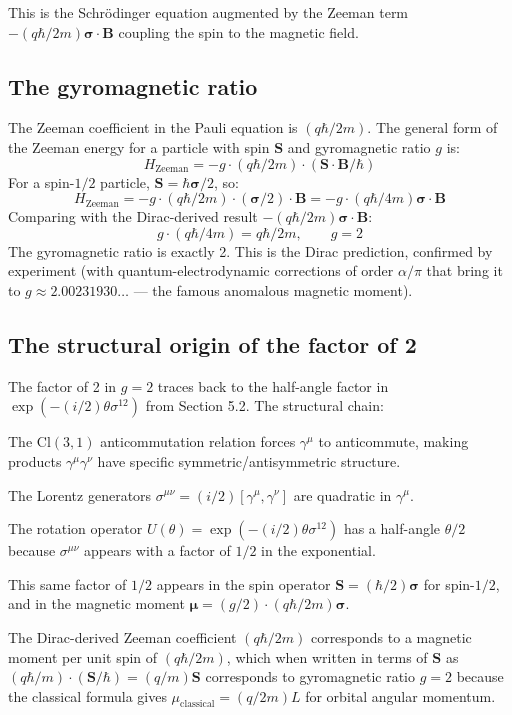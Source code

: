 \documentclass[11pt,a4paper]{article}
\begin{document}
This is the Schr\"odinger equation augmented by the Zeeman term $-(q\hbar/2m)\boldsymbol{\sigma}\cdot\mathbf{B}$ coupling the spin to the magnetic field.

\subsection{The gyromagnetic ratio}

The Zeeman coefficient in the Pauli equation is $(q\hbar/2m)$. The general form of the Zeeman energy for a particle with spin $\mathbf{S}$ and gyromagnetic ratio $g$ is:
\[
H_{\mathrm{Zeeman}} = -g\cdot(q\hbar/2m)\cdot(\mathbf{S}\cdot\mathbf{B}/\hbar)
\]
For a spin-$1/2$ particle, $\mathbf{S} = \hbar\boldsymbol{\sigma}/2$, so:
\[
H_{\mathrm{Zeeman}} = -g\cdot(q\hbar/2m)\cdot(\boldsymbol{\sigma}/2)\cdot\mathbf{B} = -g\cdot(q\hbar/4m)\boldsymbol{\sigma}\cdot\mathbf{B}
\]
Comparing with the Dirac-derived result $-(q\hbar/2m)\boldsymbol{\sigma}\cdot\mathbf{B}$:
\[
g\cdot(q\hbar/4m) = q\hbar/2m, \qquad g = 2
\]
The gyromagnetic ratio is exactly 2. This is the Dirac prediction, confirmed by experiment (with quantum-electrodynamic corrections of order $\alpha/\pi$ that bring it to $g \approx 2.00231930\ldots$ --- the famous anomalous magnetic moment).

\subsection{The structural origin of the factor of 2}

The factor of 2 in $g = 2$ traces back to the half-angle factor in $\exp(-(i/2)\theta\sigma^{12})$ from Section 5.2. The structural chain:

The $\mathrm{Cl}(3,1)$ anticommutation relation forces $\gamma^\mu$ to anticommute, making products $\gamma^\mu\gamma^\nu$ have specific symmetric/antisymmetric structure.

The Lorentz generators $\sigma^{\mu\nu} = (i/2)[\gamma^\mu, \gamma^\nu]$ are quadratic in $\gamma^\mu$.

The rotation operator $U(\theta) = \exp(-(i/2)\theta\sigma^{12})$ has a half-angle $\theta/2$ because $\sigma^{\mu\nu}$ appears with a factor of $1/2$ in the exponential.

This same factor of $1/2$ appears in the spin operator $\mathbf{S} = (\hbar/2)\boldsymbol{\sigma}$ for spin-$1/2$, and in the magnetic moment $\boldsymbol{\mu} = (g/2)\cdot(q\hbar/2m)\boldsymbol{\sigma}$.

The Dirac-derived Zeeman coefficient $(q\hbar/2m)$ corresponds to a magnetic moment per unit spin of $(q\hbar/2m)$, which when written in terms of $\mathbf{S}$ as $(q\hbar/m)\cdot(\mathbf{S}/\hbar) = (q/m)\mathbf{S}$ corresponds to gyromagnetic ratio $g = 2$ because the classical formula gives $\mu_{\mathrm{classical}} = (q/2m)L$ for orbital angular momentum.
\end{document}
